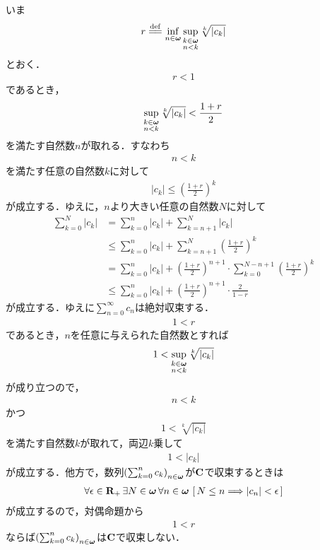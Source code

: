 	\begin{sketch}
		いま
		\begin{align}
			r \defeq \inf{n \in \Natural}{\sup{\substack{k \in \Natural \\ n < k}}{\sqrt[k]{|c_{k}|}}}
		\end{align}
		とおく．
		\begin{align}
			r < 1
		\end{align}
		であるとき，
		\begin{align}
			\operatorname*{sup}_{\substack{k \in {\boldsymbol \omega} \\ n < k}} \sqrt[k]{|c_{k}|} < \frac{1+r}{2}
		\end{align}
		を満たす自然数$n$が取れる．すなわち
		\begin{align}
			n < k
		\end{align}
		を満たす任意の自然数$k$に対して
		\begin{align}
			|c_{k}| \leq \left(\frac{1+r}{2}\right)^{k}
		\end{align}
		が成立する．ゆえに，$n$より大きい任意の自然数$N$に対して
		\begin{align}
			\sum_{k=0}^{N} |c_k|
			&= \sum_{k=0}^{n} |c_k| + \sum_{k=n+1}^{N} |c_k| \\
			&\leq \sum_{k=0}^{n} |c_k| + \sum_{k=n+1}^{N} \left(\frac{1+r}{2}\right)^{k} \\
			&= \sum_{k=0}^{n} |c_k| + \left(\frac{1+r}{2}\right)^{n+1} \cdot \sum_{k=0}^{N-n+1} \left(\frac{1+r}{2}\right)^{k} \\
			&\leq \sum_{k=0}^{n} |c_k| + \left(\frac{1+r}{2}\right)^{n+1} \cdot \frac{2}{1-r}
		\end{align}
		が成立する．ゆえに$\sum_{n=0}^{\infty} c_{n}$は絶対収束する．
		\begin{align}
			1 < r
		\end{align}
		であるとき，$n$を任意に与えられた自然数とすれば
		\begin{align}
			1 < \operatorname*{sup}_{\substack{k \in {\boldsymbol \omega} \\ n < k}} \sqrt[k]{|c_{k}|}
		\end{align}
		が成り立つので，
		\begin{align}
			n < k
		\end{align}
		かつ
		\begin{align}
			1 < \sqrt[k]{|c_{k}|}
		\end{align}
		を満たす自然数$k$が取れて，両辺$k$乗して
		\begin{align}
			1 < |c_{k}|
		\end{align}
		が成立する．他方で，数列$\left(\sum_{k=0}^{n} c_{k}\right)_{n \in {\boldsymbol \omega}}$が$\mathbf{C}$で収束するときは
		\begin{align}
			\forall \epsilon \in \mathbf{R}_+\, \exists N \in {\boldsymbol \omega}\, \forall n \in {\boldsymbol \omega}\,
			\left[\, N \leq n \Longrightarrow |c_{n}| < \epsilon\, \right]
		\end{align}
		が成立するので，対偶命題から
		\begin{align}
			1 < r
		\end{align}
		ならば$\left(\sum_{k=0}^{n} c_{k}\right)_{n \in {\boldsymbol \omega}}$は$\mathbf{C}$で収束しない．
		\QED
	\end{sketch}
	
